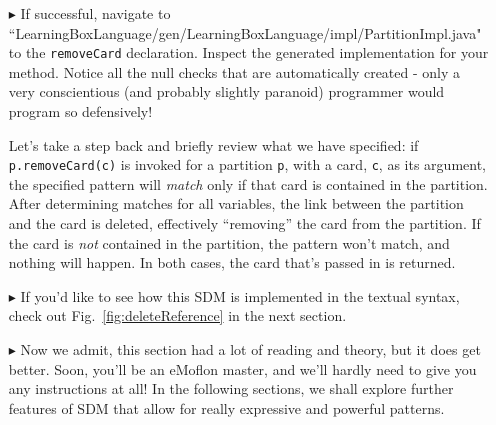 \begin{itemize}
\item[$\blacktriangleright$] If successful, navigate to ``Learning\-Box\-Language/\-gen/\-Learning\-Box\-Language/\-impl/\-Partition\-Impl.java" to the
\texttt{\-remove\-Card} declaration. Inspect the generated implementation for your method. Notice all the null checks that are automatically created - only a
very conscientious (and probably slightly paranoid) programmer would program so defensively!

Let's take a step back and briefly review what we have specified:  if \texttt{p.remove\-Card(c)} is invoked for a partition \texttt{p}, with a card, \texttt{c},
as its argument, the specified pattern will \emph{match} only if that card is contained in the partition. After determining matches for all variables, the
link between the partition and the card is deleted, effectively ``removing'' the card from the partition. If the card is \emph{not} contained in the partition,
the pattern won't match, and nothing will happen. In both cases, the card that's passed in is returned.

\item[$\blacktriangleright$] If you'd like to see how this SDM is implemented in the textual syntax, check out Fig.~\ref{fig:deleteReference} in the next
section.

\item[$\blacktriangleright$] Now we admit, this section had a lot of reading and theory, but it does get better. Soon, you'll be an eMoflon master, and we'll
hardly need to give you any instructions at all! In the following sections, we shall explore further features of SDM that allow for really expressive and
powerful patterns.


\end{itemize}

